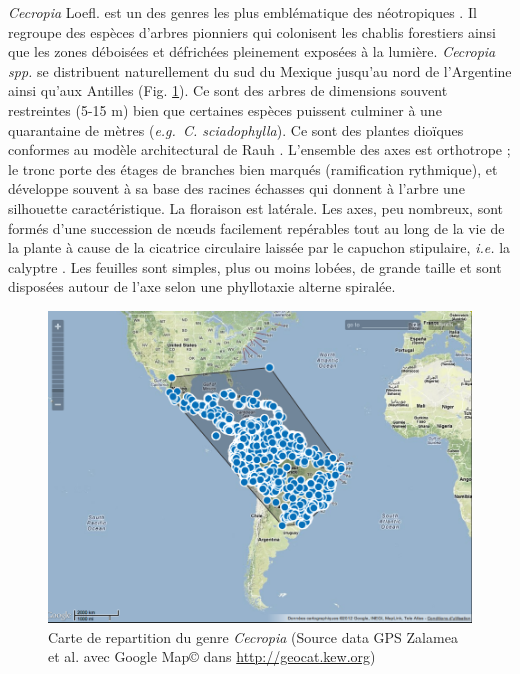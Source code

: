 \documentclass[a4paper]{article}
\theoremstyle{definition}
\theoremstyle{definition}
\theoremstyle{definition}
\theoremstyle{remark}
\begin{document}
\emph{Cecropia} Loefl. est un des genres les plus emblématique des
néotropiques \citep{Berg2005}. Il regroupe des espèces d'arbres
pionniers qui colonisent les chablis forestiers ainsi que les zones
déboisées et défrichées pleinement exposées à la lumière. \emph{Cecropia
spp.} se distribuent naturellement du sud du Mexique jusqu'au nord de
l'Argentine ainsi qu'aux Antilles (Fig. \ref{fig:fig1}). Ce sont des
arbres de dimensions souvent restreintes (5-15 m) bien que certaines
espèces puissent culminer à une quarantaine de mètres (\emph{e.g.~C.
sciadophylla}). Ce sont des plantes dioïques conformes au modèle
architectural de Rauh \citep{HalleOledeman1970, Halle1978}. L'ensemble
des axes est orthotrope ; le tronc porte des étages de branches bien
marqués (ramification rythmique), et développe souvent à sa base des
racines échasses qui donnent à l'arbre une silhouette caractéristique.
La floraison est latérale. Les axes, peu nombreux, sont formés d'une
succession de nœuds facilement repérables tout au long de la vie de la
plante à cause de la cicatrice circulaire laissée par le capuchon
stipulaire, \emph{i.e.} la calyptre \citep{Heuret2002, Zalamea2008}. Les
feuilles sont simples, plus ou moins lobées, de grande taille et sont
disposées autour de l'axe selon une phyllotaxie alterne spiralée.





\begin{figure}[H]

{\centering \includegraphics[width=0.8\linewidth]{figure/fig1} 

}

\caption{Carte de repartition du genre \emph{Cecropia} (Source data
GPS Zalamea et al. \citeyearpar{Zalamea2011} avec Google Map© dans
\url{http://geocat.kew.org})}\label{fig:fig1}
\end{figure}
\end{document}
